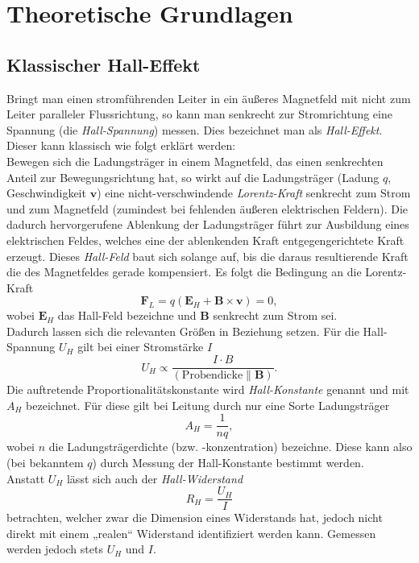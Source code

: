 \section{Theoretische Grundlagen}

\renewcommand{\V}[1]{\textbf{#1}}


\subsection{Klassischer Hall-Effekt}\label{sec:HallEffekt}
Bringt man einen stromführenden Leiter in ein äußeres Magnetfeld mit nicht zum Leiter paralleler Flussrichtung, so kann man senkrecht zur Stromrichtung eine Spannung (die \emph{Hall-Spannung}) messen. Dies bezeichnet man als \emph{Hall-Effekt}.\\

Dieser kann klassisch wie folgt erklärt werden:\\
Bewegen sich die Ladungsträger in einem Magnetfeld, das einen senkrechten Anteil zur Bewegungsrichtung hat, so wirkt auf die Ladungsträger (Ladung $q$, Geschwindigkeit $\V v$) eine nicht-verschwindende \emph{Lorentz-Kraft} senkrecht zum Strom und zum Magnetfeld (zumindest bei fehlenden äußeren elektrischen Feldern). Die dadurch hervorgerufene Ablenkung der Ladungsträger führt zur Ausbildung eines elektrischen Feldes, welches eine der ablenkenden Kraft entgegengerichtete Kraft erzeugt. Dieses \emph{Hall-Feld} baut sich solange auf, bis die daraus resultierende Kraft die des Magnetfeldes gerade kompensiert. Es folgt die Bedingung an die Lorentz-Kraft
$$\V{F}_L = q(\V{E}_H + \V{B}\times \V v )= 0,$$
wobei $\V E_H$ das Hall-Feld bezeichne und $\V B$ senkrecht zum Strom sei.\\
Dadurch lassen sich die relevanten Größen in Beziehung setzen. Für die Hall-Spannung $U_H$ gilt bei einer Stromstärke $I$
\begin{equation}\label{eq:HallSpannung}
U_H \propto \frac{I\cdot B}{(\text{Probendicke} \parallel \V B)}.
\end{equation}
Die auftretende Proportionalitätskonstante wird \emph{Hall-Konstante} genannt und mit $A_H$ bezeichnet. Für diese gilt bei Leitung durch nur eine Sorte Ladungsträger
\begin{equation}
A_H = \frac{1}{nq},
\end{equation}
wobei $n$ die Ladungsträgerdichte (bzw. -konzentration) bezeichne. Diese kann also (bei bekanntem $q$) durch Messung der Hall-Konstante bestimmt werden.\\
Anstatt $U_H$ lässt sich auch der \emph{Hall-Widerstand}
\begin{equation}\label{eq:HallWiderstand}
R_H = \frac{U_H}{I}
\end{equation}
betrachten, welcher zwar die Dimension eines Widerstands hat, jedoch nicht direkt mit einem „realen“ Widerstand identifiziert werden kann. Gemessen werden jedoch stets $U_H$ und $I$.

